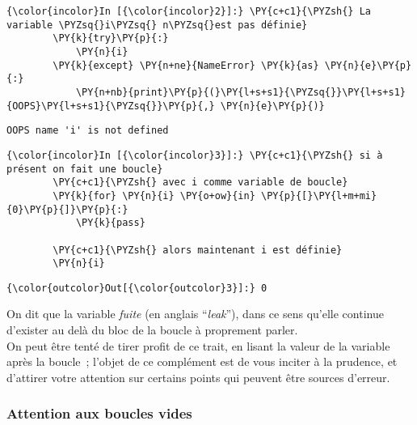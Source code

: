     \begin{Verbatim}[commandchars=\\\{\}]
{\color{incolor}In [{\color{incolor}2}]:} \PY{c+c1}{\PYZsh{} La variable \PYZsq{}i\PYZsq{} n\PYZsq{}est pas définie}
        \PY{k}{try}\PY{p}{:}
            \PY{n}{i}
        \PY{k}{except} \PY{n+ne}{NameError} \PY{k}{as} \PY{n}{e}\PY{p}{:}
            \PY{n+nb}{print}\PY{p}{(}\PY{l+s+s1}{\PYZsq{}}\PY{l+s+s1}{OOPS}\PY{l+s+s1}{\PYZsq{}}\PY{p}{,} \PY{n}{e}\PY{p}{)}
\end{Verbatim}


    \begin{Verbatim}[commandchars=\\\{\}]
OOPS name 'i' is not defined

    \end{Verbatim}

    \begin{Verbatim}[commandchars=\\\{\}]
{\color{incolor}In [{\color{incolor}3}]:} \PY{c+c1}{\PYZsh{} si à présent on fait une boucle}
        \PY{c+c1}{\PYZsh{} avec i comme variable de boucle}
        \PY{k}{for} \PY{n}{i} \PY{o+ow}{in} \PY{p}{[}\PY{l+m+mi}{0}\PY{p}{]}\PY{p}{:}
            \PY{k}{pass}
        
        \PY{c+c1}{\PYZsh{} alors maintenant i est définie}
        \PY{n}{i}
\end{Verbatim}


\begin{Verbatim}[commandchars=\\\{\}]
{\color{outcolor}Out[{\color{outcolor}3}]:} 0
\end{Verbatim}
            
    On dit que la variable \emph{fuite} (en anglais ``\emph{leak}''), dans
ce sens qu'elle continue d'exister au delà du bloc de la boucle à
proprement parler.\\

    On peut être tenté de tirer profit de ce trait, en lisant la valeur de
la variable après la boucle~; l'objet de ce complément est de vous
inciter à la prudence, et d'attirer votre attention sur certains points
qui peuvent être sources d'erreur.

    \hypertarget{attention-aux-boucles-vides}{%
\subsubsection{Attention aux boucles
vides}\label{attention-aux-boucles-vides}}

